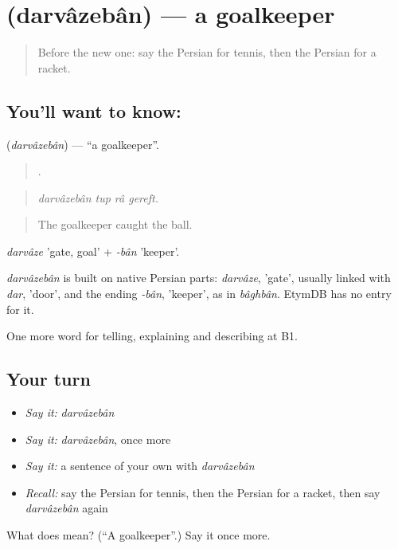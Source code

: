 \section[\texorpdfstring{\fa{دروازه} \fa{بان} (darvâzebân)}{دروازه بان (darvâzebân)}]{  (darvâzebân) — a goalkeeper}

\label{lesson:FA-C514-darvazeban}



\begin{quote}
Before the new one: say the Persian for tennis, then the Persian for a racket.
\end{quote}

\subsection*{You'll want to know:  }
\textbf{ } (\emph{darvâzebân}) — \textquotedblleft{}a goalkeeper\textquotedblright{}.

\begin{quote}
    .
\end{quote}

\begin{quote}
\emph{darvâzebân tup râ gereft.}
\end{quote}

\begin{quote}
The goalkeeper caught the ball.
\end{quote}

\emph{darvâze} 'gate, goal' + \emph{-bân} 'keeper'.

\begin{cousinweb}
\emph{darvâzebân} is built on native Persian parts: \emph{darvâze}, 'gate', usually linked with \emph{dar}, 'door', and the ending \emph{-bân}, 'keeper', as in \emph{bâghbân}. EtymDB has no entry for it.
\end{cousinweb}

\begin{grammarlens}[title={What you've built}]
One more word for telling, explaining and describing at B1.
\end{grammarlens}

\subsection*{Your turn}
\begin{itemize}
\raggedright
  \item \emph{Say it:} \emph{darvâzebân}
  \item \emph{Say it:} \emph{darvâzebân}, once more
  \item \emph{Say it:} a sentence of your own with \emph{darvâzebân}
  \item \emph{Recall:} say the Persian for tennis, then the Persian for a racket, then say \emph{darvâzebân} again
\end{itemize}

\begin{tcolorbox}[breakable,colback=teal!4,colframe=teal!35!black,title={Before you move on}]
What does   mean? (\textquotedblleft{}A goalkeeper\textquotedblright{}.) Say it once more.
\end{tcolorbox}
